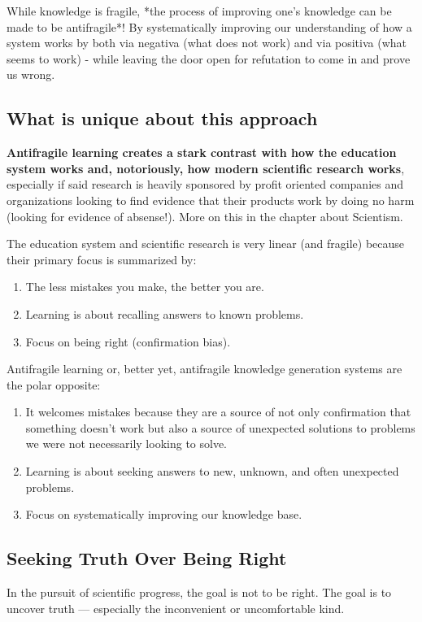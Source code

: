 \documentclass{article}
\begin{document}
While knowledge is fragile, *the process of improving one's knowledge can be made to be antifragile*! By systematically improving our understanding of how a system works by both via negativa (what does not work) and via positiva (what seems to work) - while leaving the door open for refutation to come in and prove us wrong.

\subsection{What is unique about this approach}

\textbf{Antifragile learning creates a stark contrast with how the education system works and, notoriously, how modern scientific research works}, especially if said research is heavily sponsored by profit oriented companies and organizations looking to find evidence that their products work by doing no harm (looking for evidence of absense!). More on this in the chapter about Scientism.

The education system and scientific research is very linear (and fragile) because their primary focus is summarized by:
\begin{enumerate}
	\item The less mistakes you make, the better you are.
	\item Learning is about recalling answers to known problems.
	\item Focus on being right (confirmation bias).
\end{enumerate}


Antifragile learning or, better yet, antifragile knowledge generation systems are the polar opposite:
\begin{enumerate}
	\item It welcomes mistakes because they are a source of not only confirmation that something doesn't work but also a source of unexpected solutions to problems we were not necessarily looking to solve.
	\item Learning is about seeking answers to new, unknown, and often unexpected problems.
	\item Focus on systematically improving our knowledge base.
\end{enumerate}


\subsection{Seeking Truth Over Being Right}

In the pursuit of scientific progress, the goal is not to be right. The goal is to uncover truth — especially the inconvenient or uncomfortable kind.
\end{document}
